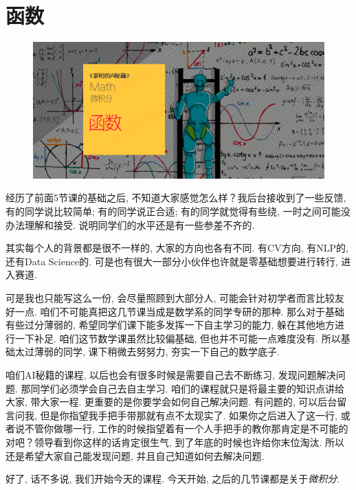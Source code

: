 \chapter{函数}

\begin{figure}[ht]
  \centering
  \includegraphics[width=1\textwidth]{asset/茶桁的AI秘籍_Math_6.png}
\end{figure}

\newpage

经历了前面5节课的基础之后, 不知道大家感觉怎么样？我后台接收到了一些反馈, 有的同学说比较简单; 有的同学说正合适; 有的同学就觉得有些绕, 一时之间可能没办法理解和接受. 说明同学们的水平还是有一些参差不齐的. 

其实每个人的背景都是很不一样的, 大家的方向也各有不同. 有CV方向, 有NLP的, 还有Data Science的. 可是也有很大一部分小伙伴也许就是零基础想要进行转行, 进入赛道. 

可是我也只能写这么一份, 会尽量照顾到大部分人, 可能会针对初学者而言比较友好一点. 咱们不可能真把这几节课当成是数学系的同学专研的那种. 那么对于基础有些过分薄弱的, 希望同学们课下能多发挥一下自主学习的能力, 躲在其他地方进行一下补足. 咱们这节数学课虽然比较偏基础, 但也并不可能一点难度没有. 所以基础太过薄弱的同学, 课下稍微去努努力, 夯实一下自己的数学底子. 

咱们AI秘籍的课程, 以后也会有很多时候是需要自己去不断练习, 发现问题解决问题. 那同学们必须学会自己去自主学习. 咱们的课程就只是将最主要的知识点讲给大家, 带大家一程. 更重要的是你要学会如何自己解决问题. 有问题的, 可以后台留言问我, 但是你指望我手把手带那就有点不太现实了. 如果你之后进入了这一行, 或者说不管你做哪一行, 工作的时候指望着有一个人手把手的教你那肯定是不可能的对吧？领导看到你这样的话肯定很生气, 到了年底的时候也许给你末位淘汰. 所以还是希望大家自己能发现问题, 并且自己知道如何去解决问题. 

好了, 话不多说, 我们开始今天的课程. 今天开始, 之后的几节课都是关于\textit{微积分}. 

